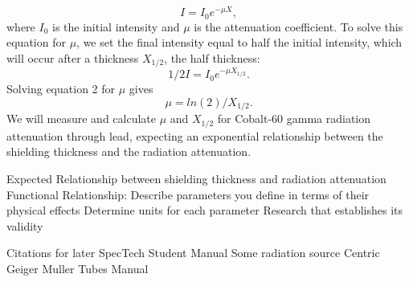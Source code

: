 \begin{equation}
I = I_0e^{-\mu X},
\end{equation}
where $I_0$ is the initial intensity and $\mu$ is the attenuation coefficient. To solve this equation for $\mu$, we set the final intensity equal to half the initial intensity, which will occur after a thickness $X_{1/2}$, the half thickness:
\begin{equation}
1/2 I = I_0e^{-\mu X_{1/2}}.
\end{equation}
Solving equation 2 for $\mu$ gives
\begin{equation}
\mu = ln(2)/{X_{1/2}}.
\end{equation}
We will measure and calculate $\mu$ and $X_{1/2}$ for Cobalt-60 gamma radiation attenuation through lead, expecting an exponential relationship between the shielding thickness and the radiation attenuation\cite{Student Manual}.



Expected Relationship between shielding thickness and radiation attenuation
Functional Relationship:
Describe parameters you define in terms of their physical effects
Determine units for each parameter
Research that establishes its validity

Citations for later
SpecTech Student Manual
Some radiation source
Centric Geiger Muller Tubes Manual
